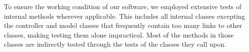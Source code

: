 To ensure the working condition of our software, we employed extensive tests of internal methods wherever applicable. 
This includes all internal classes excepting the controller and model classes that frequently contain too many links to other classes, making testing them alone impractical. Most of the methods in those classes are indirectly tested through the tests of the classes they call upon. 

